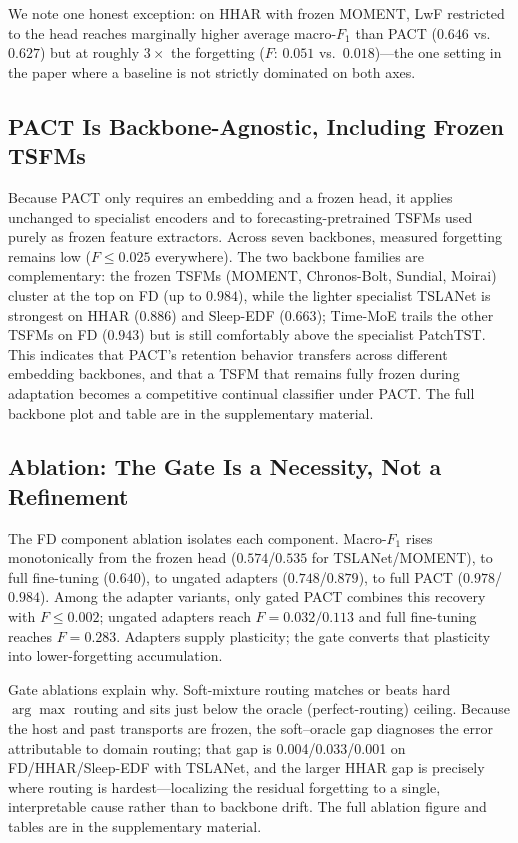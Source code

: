 \documentclass[letterpaper]{article} %
\begin{document}
We note one honest exception: on HHAR with frozen MOMENT, LwF restricted to the head reaches
marginally higher average macro-$F_1$ than PACT ($0.646$ vs.\ $0.627$) but at roughly
$3\times$ the forgetting ($F$: $0.051$ vs.\ $0.018$)---the one setting in the
paper where a baseline is not strictly dominated on both axes.

\subsection{PACT Is Backbone-Agnostic, Including Frozen TSFMs}
\label{sec:backbones}
Because PACT only requires an embedding and a frozen head, it applies
unchanged to specialist encoders and to forecasting-pretrained TSFMs used
purely as frozen feature extractors. Across seven backbones,
measured forgetting remains low
($F\!\le\!0.025$ everywhere). The two backbone families are complementary:
the frozen TSFMs (MOMENT, Chronos-Bolt, Sundial, Moirai) cluster at the top
on FD (up to $0.984$), while the lighter specialist TSLANet is strongest on
HHAR ($0.886$) and Sleep-EDF ($0.663$); Time-MoE trails the other TSFMs on FD ($0.943$) but is
still comfortably above the specialist PatchTST. This indicates that PACT's
retention behavior transfers across different embedding backbones, and
that a TSFM that remains fully frozen during adaptation becomes a
competitive continual classifier under PACT.
The full backbone plot and table are in the supplementary material.

\subsection{Ablation: The Gate Is a Necessity, Not a Refinement}
\label{sec:ablation}
The FD component ablation isolates each component.
Macro-$F_1$ rises monotonically from the frozen head ($0.574$/$0.535$ for
TSLANet/MOMENT), to full fine-tuning ($0.640$), to
ungated adapters ($0.748$/$0.879$), to full PACT ($0.978$/$0.984$).
Among the adapter variants, only gated PACT combines this recovery with
$F\!\le\!0.002$; ungated adapters reach $F=0.032/0.113$ and full fine-tuning
reaches $F=0.283$. Adapters supply plasticity; the gate converts that
plasticity into lower-forgetting accumulation.

Gate ablations explain why. Soft-mixture routing matches or beats hard $\arg\max$
routing and sits just below the oracle (perfect-routing) ceiling. Because the
host and past transports are frozen, the soft--oracle gap diagnoses the error
attributable to domain routing; that gap is
0.004/0.033/0.001 on FD/HHAR/Sleep-EDF with TSLANet, and the larger HHAR
gap is precisely where routing is hardest---localizing the residual forgetting
to a single, interpretable cause rather than to backbone drift.
The full ablation figure and tables are in the supplementary material.
\end{document}
